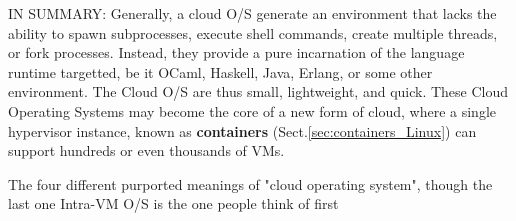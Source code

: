 IN SUMMARY: Generally, a cloud O/S generate an environment that lacks the
ability to spawn subprocesses, execute shell commands, create multiple threads,
or fork processes. Instead, they provide a pure incarnation of the language
runtime targetted, be it OCaml, Haskell, Java, Erlang, or some other
environment.
The Cloud O/S are thus small, lightweight, and quick. These Cloud Operating
Systems may become the core of a new form of cloud, where a single hypervisor
instance, known as {\bf containers} (Sect.\ref{sec:containers_Linux}) can
support hundreds or even thousands of VMs.
 


The four different purported meanings of "cloud operating system", though the
last one Intra-VM O/S is the one people think of first

